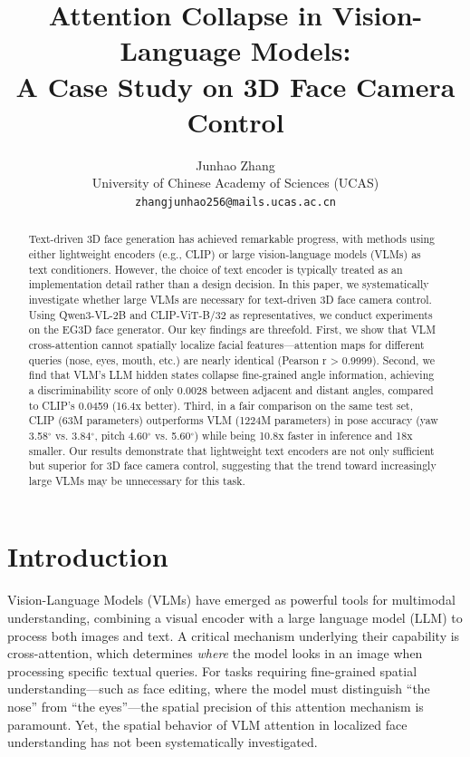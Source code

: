 \documentclass[10pt,twocolumn,letterpaper]{article}
\title{\vspace{-0.5in}Attention Collapse in Vision-Language Models: \\ A Case Study on 3D Face Camera Control}
\author{
  Junhao Zhang \\
  University of Chinese Academy of Sciences (UCAS) \\
  \texttt{zhangjunhao256@mails.ucas.ac.cn}
}
\begin{document}
\maketitle
\thispagestyle{empty}

\begin{abstract}
Text-driven 3D face generation has achieved remarkable progress, with methods using either lightweight encoders (e.g., CLIP) or large vision-language models (VLMs) as text conditioners. However, the choice of text encoder is typically treated as an implementation detail rather than a design decision. In this paper, we systematically investigate whether large VLMs are necessary for text-driven 3D face camera control. Using Qwen3-VL-2B and CLIP-ViT-B/32 as representatives, we conduct experiments on the EG3D face generator. Our key findings are threefold. First, we show that VLM cross-attention cannot spatially localize facial features---attention maps for different queries (nose, eyes, mouth, etc.) are nearly identical (Pearson r > 0.9999). Second, we find that VLM's LLM hidden states collapse fine-grained angle information, achieving a discriminability score of only 0.0028 between adjacent and distant angles, compared to CLIP's 0.0459 (16.4x better). Third, in a fair comparison on the same test set, CLIP (63M parameters) outperforms VLM (1224M parameters) in pose accuracy (yaw 3.58$^\circ$ vs. 3.84$^\circ$, pitch 4.60$^\circ$ vs. 5.60$^\circ$) while being 10.8x faster in inference and 18x smaller. Our results demonstrate that lightweight text encoders are not only sufficient but superior for 3D face camera control, suggesting that the trend toward increasingly large VLMs may be unnecessary for this task.
\end{abstract}


\section{Introduction}
\label{sec:intro}

Vision-Language Models (VLMs) have emerged as powerful tools for multimodal understanding, combining a visual encoder with a large language model (LLM) to process both images and text. A critical mechanism underlying their capability is cross-attention, which determines \emph{where} the model looks in an image when processing specific textual queries. For tasks requiring fine-grained spatial understanding---such as face editing, where the model must distinguish ``the nose'' from ``the eyes''---the spatial precision of this attention mechanism is paramount. Yet, the spatial behavior of VLM attention in localized face understanding has not been systematically investigated.
\end{document}
